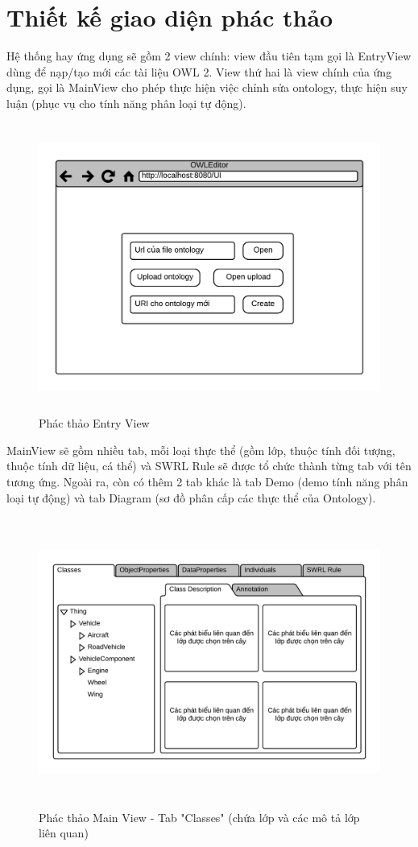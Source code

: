 \section{Thiết kế giao diện phác thảo}
Hệ thống hay ứng dụng sẽ gồm 2 view chính: view đầu tiên tạm gọi là EntryView dùng để nạp/tạo mới các tài liệu OWL 2. View thứ hai là view chính của ứng dụng, gọi là MainView cho phép thực hiện việc chỉnh sửa ontology, thực hiện suy luận (phục vụ cho tính năng phân loại tự động). 
\begin{figure}[ht!]
	\centering
	\includegraphics[width=150mm,height=95mm]{Figures/ui_entryview.png}
	\caption{Phác thảo Entry View \label{overflow}}
\end{figure}
MainView sẽ gồm nhiều tab, mỗi loại thực thể (gồm lớp, thuộc tính đối tượng, thuộc tính dữ liệu, cá thể) và SWRL Rule sẽ được tổ chức thành từng tab với tên tương ứng. Ngoài ra, còn có thêm 2 tab khác là tab Demo (demo tính năng phân loại tự động) và tab Diagram (sơ đồ phân cấp các thực thể của Ontology).
\begin{figure}[h!]
	\centering
	\includegraphics[width=150mm,height=95mm]{Figures/ui_mainview.png}
	\caption{Phác thảo Main View - Tab "Classes" (chứa lớp và các mô tả lớp liên quan) \label{overflow}}
\end{figure}
